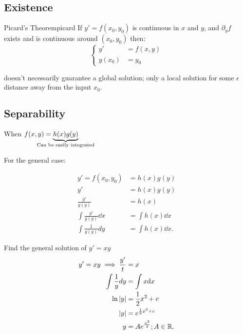 \documentclass[../notes.tex]{subfiles}
\begin{document}
\subsection{Existence}

\begin{theorem}{Picard's Theorem}{picard}
				If $y' = f( x_0,y_0 )$ is continuous in $x$ and $y$, and  $\partial_y f$ exists and is continuous around  $( x_0,y_0 ) $ then:
				\[
				\begin{cases}
								y' &= f( x,y ) \\
								y( x_0 ) &= y_0 
				\end{cases}
				\] 
\end{theorem}

 doesn't necessarily guarantee a global solution; only a local solution for some $\epsilon$ distance away from the input  $x_0$.

\subsection{Separability}

\begin{center}
When $f( x,y ) = \underbrace{h( x ) g( y )}_{\clap{\scriptsize Can be easily integrated}} $ 
\end{center}

For the general case:

\begin{align*}
				y' = f( x_0,y_0 ) &= h( x ) g( y ) \\
				y' &= h( x ) g( y ) \\
				\frac{y'}{g( y )} &= h( x ) \\
				\int \frac{y'}{g( y ) } \dd x &= \int h( x ) \dd x \\
				\int \frac{1}{g( y ) } dy &= \int h( x ) \dd x
.\end{align*}

\begin{example}{Find the general solution of $y' = xy$}
\begin{align*}
				y' = xy \implies \frac{y'}{t} &= x \\
				\int \frac{1}{y} dy &= \int x \dd x \\
				\ln \abs{y}  &= \frac{1}{2}x^2 + c \\
				\abs{y} &= e^{\frac{1}{2}x^2 + c} \\
				y &= Ae^{\frac{x^2}{2}}; A \in \mathbb{R}
.\end{align*}
\end{example}
\end{document}
